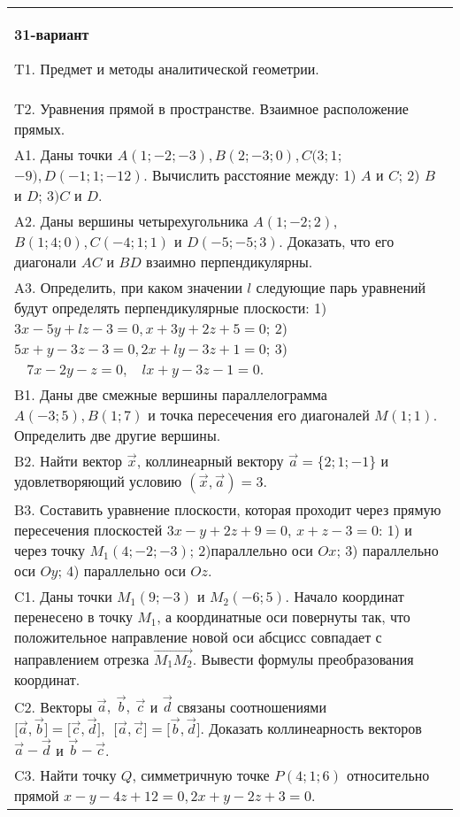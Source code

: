 \documentclass{article}
\begin{document}
\begin{tabular}{m{17cm}}
\textbf{31-вариант}
\newline

T1. Предмет и методы аналитической геометрии.
 \\
T2. 
Уравнения прямой в пространстве. Взаимное расположение прямых.
 \\
A1. 
Даны точки \(A(1; - 2; - 3),B(2; - 3;0),C(3;1\); \(- 9),D( - 1;1; - 12)\). Вычислить расстояние между: 1) \(A\) и \(C\); 2) \(B\) и \(D\); 3\()C\) и \(D\).
 \\
A2. 
Даны вершины четырехугольника \(A(1; - 2;2)\), \(B(1;4;0),C( - 4;1;1)\) и \(D( - 5; - 5;3)\). Доказать, что его диагонали \(AC\) и \(BD\) взаимно перпендикулярны.
 \\
A3. 
Определить, при каком значении \(l\) следующие парь уравнений будут определять перпендикулярные плоскости: 1) \(3x - 5y + lz - 3 = 0,x + 3y + 2z + 5 = 0\); 2) \(5x + y - 3z - 3 = 0,2x + ly - 3z + 1 = 0\); 3) \(\ \ \ \ 7x - 2y - z = 0,\ \ \ \ lx + y - 3z - 1 = 0\).
 \\
B1. 
Даны две смежные вершины параллелограмма \(A( - 3;5),B(1;7)\) и точка пересечения его диагоналей \(M(1;1)\). Определить две другие вершины.
 \\
B2. 
Найти вектор \(\overrightarrow{x}\), коллинеарный вектору \(\overrightarrow{a} = \{ 2;1; - 1\}\) и удовлетворяющий условию \(\left( \overrightarrow{x},\overrightarrow{a} \right) = 3\).
 \\
B3. 
Составить уравнение плоскости, которая проходит через прямую пересечения плоскостей \(3x - y + 2z + 9 = 0\), \(x + z - 3 = 0\): 1) и через точку \(M_{1}(4; - 2; - 3)\); 2)параллельно оси \(Ox\); 3) параллельно оси \(Oy\); 4) параллельно оси \(Oz\).
 \\
C1. 
Даны точки \(M_{1}(9; - 3)\) и \(M_{2}( - 6;5)\). Начало координат перенесено в точку \(M_{1}\), а координатные оси повернуты так, что положительное направление новой оси абсцисс совпадает с направлением отрезка \(\overrightarrow{M_{1}M_{2}}\). Вывести формулы преобразования координат.
 \\
C2. 
Векторы \(\overrightarrow{a},\ \overrightarrow{b},\ \overrightarrow{c}\) и \(\overrightarrow{d}\) связаны соотношениями \(\lbrack\overrightarrow{a},\overrightarrow{b}\rbrack = \lbrack\overrightarrow{c},\overrightarrow{d}\rbrack,\ \ \lbrack\overrightarrow{a},\overrightarrow{c}\rbrack = \lbrack\overrightarrow{b},\overrightarrow{d}\rbrack\). Доказать коллинеарность векторов \(\overrightarrow{a} - \overrightarrow{d}\) и \(\overrightarrow{b} - \overrightarrow{c}\).
 \\
C3. 
Найти точку \(Q\), симметричную точке \(P(4;1;6)\) относительно прямой \(x - y - 4z + 12 = 0,2x + y - 2z + 3 = 0\).
 \\

\end{tabular}
\vspace{1cm}
\end{document}
